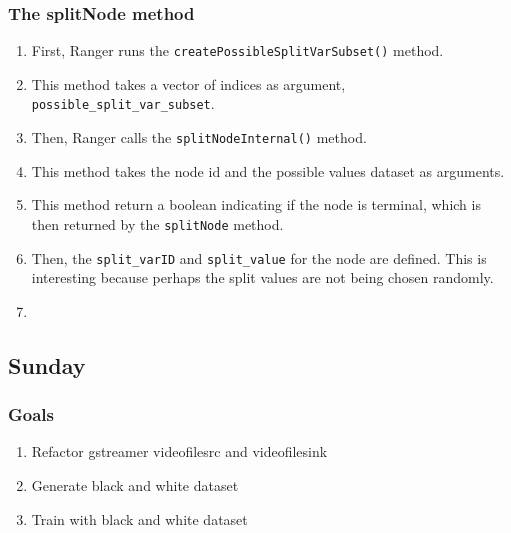 \documentclass[12pt,oneside]{book}
\begin{document}
\subsubsection{The splitNode method}

\begin{enumerate}
  \item First, Ranger runs the \lstinline|createPossibleSplitVarSubset()| method.
  \item This method takes a vector of indices as argument, \lstinline|possible_split_var_subset|.
  \item Then, Ranger calls the \lstinline|splitNodeInternal()| method.
  \item This method takes the node id and the possible values dataset as arguments.
  \item This method return a boolean indicating if the node is terminal, which is then returned by the \lstinline|splitNode| method.
  \item Then, the \lstinline|split_varID| and \lstinline|split_value| for the node are defined. This is interesting because perhaps the split values are not being chosen randomly.
  \item 
\end{enumerate}



\subsection*{Sunday}

\subsubsection{Goals}
\begin{enumerate}
  \item Refactor gstreamer videofilesrc and videofilesink
  \item Generate black and white dataset
  \item Train with black and white dataset
\end{enumerate}
\end{document}
